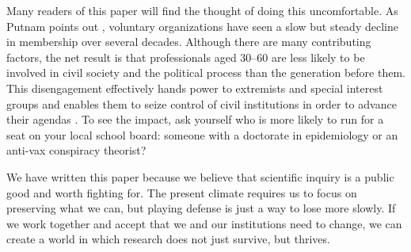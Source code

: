 \documentclass[10pt,letterpaper]{article}
\begin{document}
Many readers of this paper will find the thought of doing this uncomfortable.
As Putnam points out \cite{Putnam2020}, voluntary organizations have seen a slow but steady decline in membership over several decades.
Although there are many contributing factors, the net result is that professionals aged 30--60 are less likely to be involved in civil society and the political process than the generation before them.
This disengagement effectively hands power to extremists and special interest groups and enables them to seize control of civil institutions in order to advance their agendas \cite{BuenoDeMesquita2022}. 
To see the impact, ask yourself who is more likely to run for a seat on your local school board: someone with a doctorate in epidemiology or an anti-vax conspiracy theorist?

We have written this paper because we believe that scientific inquiry is a public good and worth fighting for.
The present climate requires us to focus on preserving what we can, but playing defense is just a way to lose more slowly.
If we work together and accept that we and our institutions need to change, we can create a world in which research does not just survive, but thrives.


\end{document}
